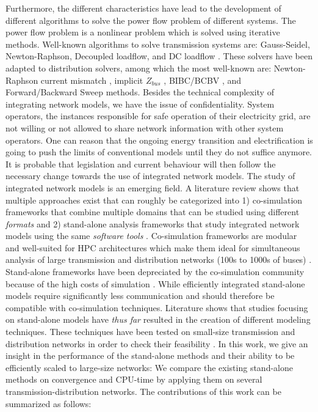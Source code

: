 \documentclass[10pt,journal]{article}
\begin{document}
Furthermore, the different characteristics have lead to the development of different algorithms to solve the power flow problem of different systems. The power flow problem is a nonlinear problem which is solved using iterative methods. Well-known algorithms to solve transmission systems are: Gauss-Seidel, Newton-Raphson, Decoupled loadflow, and DC loadflow \cite{Schavemaker2008chap6}. These solvers have been adapted to distribution solvers, among which the most well-known are: Newton-Raphson current mismatch \cite{Garcia2000}\cite{Abdel-akher2005}, implicit $Z_{bus}$ \cite{Teng2002a}\cite{Chen1991a}, BIBC/BCBV \cite{Teng2008}\cite{Farag2011}, and Forward/Backward Sweep \cite{Moghaddas2009}\cite{Eminoglu2008} methods. Besides the technical complexity of integrating network models, we have the issue of confidentiality. System operators, the instances responsible for safe operation of their electricity grid,  are not willing or not allowed to share network information with other system operators. One can reason that the ongoing energy transition and electrification is going to push the limits of conventional models until they do not suffice anymore.  It is probable that legislation and current behaviour will then follow the necessary change towards the use of integrated network models. 
\newline\newline 
The study of integrated network models is an emerging field. A literature review shows that multiple approaches exist that can roughly be categorized into 1) co-simulation frameworks that combine multiple domains that can be studied using different \textit{formats} and 2) stand-alone analysis frameworks that study integrated network models using the same \textit{software tools} \cite{https://ieeexplore.ieee.org/stamp/stamp.jsp?tp=&arnumber=8585926}. Co-simulation frameworks are modular and well-suited for HPC architectures which make them ideal for simultaneous analysis of large transmission and distribution networks (100s to 1000s of buses) \cite{https://www.nrel.gov/docs/fy16osti/65550.pdf}. Stand-alone frameworks have been depreciated by the co-simulation community because of the high costs of simulation \cite{https://ieeexplore.ieee.org/stamp/stamp.jsp?tp=&arnumber=8585926}. While efficiently integrated stand-alone models require significantly less communication and should therefore be compatible with co-simulation techniques. Literature shows that studies focusing on stand-alone models have \textit{thus far} resulted in the creation of different modeling techniques. These techniques have been tested on small-size transmission and distribution networks in order to check their feasibility \cite{Taranto2008}\cite{Sun2015}. In this work, we give an insight in the performance of the stand-alone methods and their ability to be efficiently scaled to large-size networks: We compare the existing stand-alone methods on convergence and CPU-time by applying them on several transmission-distribution networks. The contributions of this work can be summarized as follows: 
\end{document}
